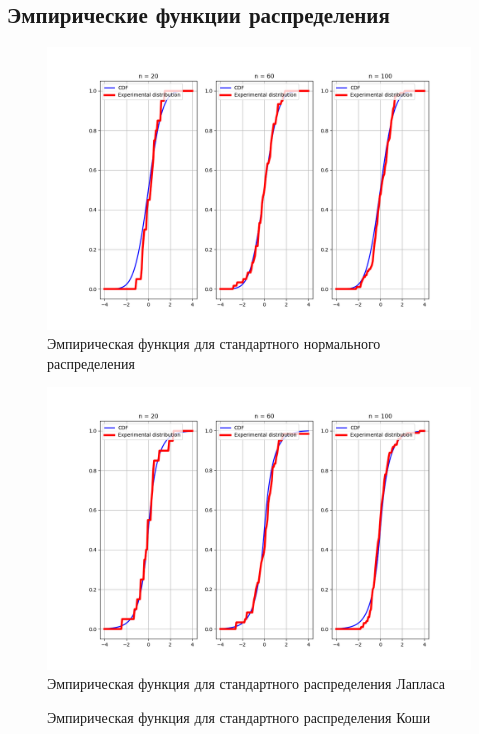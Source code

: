 \documentclass[a4]{article}
\begin{document}
\subsection{Эмпирические функции распределения}
\begin{center}
	\begin{figure}[H]
		\caption{Эмпирическая функция для стандартного нормального распределения}
		\includegraphics[width=\textwidth]{Lab4_normal_cdf.png}
	\end{figure}
	\begin{figure}[H]
		\caption{Эмпирическая функция для стандартного распределения Лапласа}
		\includegraphics[width=\textwidth]{Lab4_laplace_cdf.png}
	\end{figure}
	\begin{figure}[H]
		\caption{Эмпирическая функция для стандартного распределения Коши}

\end{figure}
\end{center}
\end{document}
